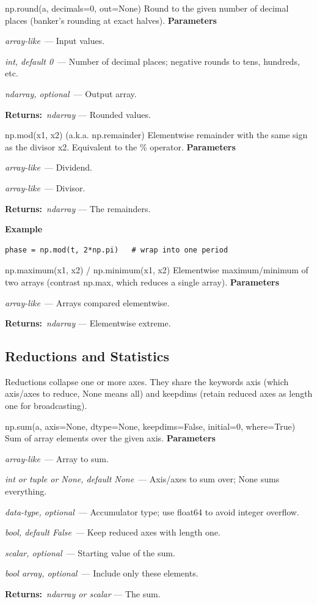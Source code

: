 \documentclass[10pt]{article}
\newenvironment{params}
  {\smallskip\textbf{\small\color{accent}Parameters}\par\nopagebreak
   \begin{description}[leftmargin=1.3em,itemsep=1.5pt,parsep=0pt,topsep=1pt,
      labelindent=0pt,style=sameline,font=\normalfont]}
  {\end{description}}
\newcommand{\pitem}[3]{\item[{\ttfamily\color{accent}#1}]{\itshape #2}\ --- #3}
\newcommand{\preturn}[2]{\smallskip\textbf{\small\color{accent}Returns:}\ {\itshape #1} --- #2\par}
\begin{document}
\begin{func}{np.round(a, decimals=0, out=None)}
Round to the given number of decimal places (banker's rounding at exact halves).
\begin{params}
\pitem{a}{array-like}{Input values.}
\pitem{decimals}{int, default 0}{Number of decimal places; negative rounds to tens, hundreds, etc.}
\pitem{out}{ndarray, optional}{Output array.}
\end{params}
\preturn{ndarray}{Rounded values.}
\end{func}
\medskip

\begin{func}{np.mod(x1, x2)  (a.k.a. np.remainder)}
Elementwise remainder with the same sign as the divisor x2. Equivalent to the \% operator.
\begin{params}
\pitem{x1}{array-like}{Dividend.}
\pitem{x2}{array-like}{Divisor.}
\end{params}
\preturn{ndarray}{The remainders.}
\smallskip\textbf{\small\color{accent}Example}
\begin{lstlisting}[style=py]
phase = np.mod(t, 2*np.pi)   # wrap into one period
\end{lstlisting}
\end{func}
\medskip

\begin{func}{np.maximum(x1, x2) / np.minimum(x1, x2)}
Elementwise maximum/minimum of two arrays (contrast np.max, which reduces a single array).
\begin{params}
\pitem{x1, x2}{array-like}{Arrays compared elementwise.}
\end{params}
\preturn{ndarray}{Elementwise extreme.}
\end{func}
\medskip

\subsection{Reductions and Statistics}
Reductions collapse one or more axes. They share the keywords axis (which axis/axes to reduce, None means all) and keepdims (retain reduced axes as length one for broadcasting).

\begin{func}{np.sum(a, axis=None, dtype=None, keepdims=False, initial=0, where=True)}
Sum of array elements over the given axis.
\begin{params}
\pitem{a}{array-like}{Array to sum.}
\pitem{axis}{int or tuple or None, default None}{Axis/axes to sum over; None sums everything.}
\pitem{dtype}{data-type, optional}{Accumulator type; use float64 to avoid integer overflow.}
\pitem{keepdims}{bool, default False}{Keep reduced axes with length one.}
\pitem{initial}{scalar, optional}{Starting value of the sum.}
\pitem{where}{bool array, optional}{Include only these elements.}
\end{params}
\preturn{ndarray or scalar}{The sum.}
\end{func}
\medskip
\end{document}
